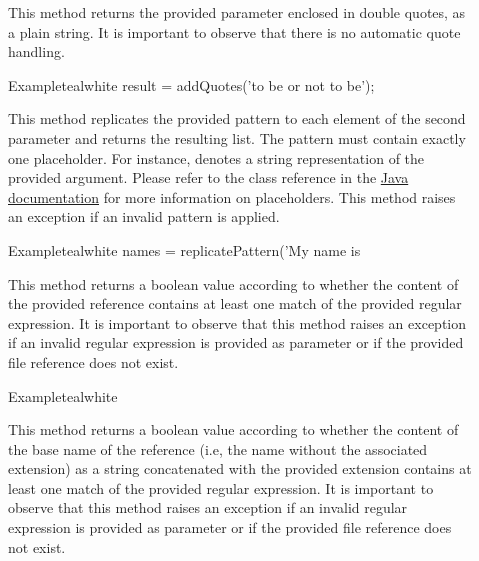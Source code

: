 \begin{description}
\item[] This method returns the provided parameter enclosed in double quotes, as a plain string. It is important to observe that there is no automatic quote handling.

\begin{codebox}{Example}{teal}{\icnote}{white}
result = addQuotes('to be or not to be');
\end{codebox}

\item[] This method replicates the provided pattern to each element of the second parameter and returns the resulting list. The pattern must contain exactly one placeholder. For instance,  denotes a string representation of the provided argument. Please refer to the  class reference in the \href{https://docs.oracle.com/javase/7/docs/api/java/util/Formatter.html}{Java documentation} for more information on placeholders. This method raises an exception if an invalid pattern is applied.

\begin{codebox}{Example}{teal}{\icnote}{white}
names = replicatePattern('My name is %
\end{codebox}

\item[] This method returns a boolean value according to whether the content of the provided  reference contains at least one match of the provided  regular expression. It is important to observe that this method raises an exception if an invalid regular expression is provided as parameter or if the provided file reference does not exist.

\begin{codebox}{Example}{teal}{\icnote}{white}
\end{codebox}

\item[] This method returns a boolean value according to whether the content of the base name of the  reference (i.e, the name without the associated extension) as a string concatenated with the provided  extension contains at least one match of the provided  regular expression. It is important to observe that this method raises an exception if an invalid regular expression is provided as parameter or if the provided file reference does not exist.
\end{description}


